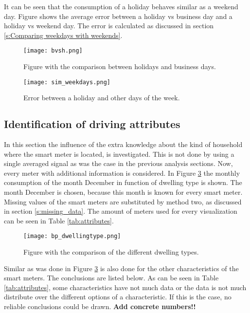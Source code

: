 It can be seen that the consumption of a holiday behaves similar as a weekend day. Figure shows the average error between a holiday vs business day and a holiday vs weekend day. The error is calculated as discussed in section \ref{s:Comparing weekdays with weekends}. 

\begin{figure}[h!]
	\centering
	\texttt{[image: bvsh.png]}
	\caption{Figure with the comparison between holidays and business days.}
	\label{fig:bvsh}
\end{figure}

\begin{figure}[h!]
	\centering
	\texttt{[image: sim\_weekdays.png]}
	\caption{Error between a holiday and other days of the week.}
	\label{fig:sim_weekdays}
\end{figure}


\subsection{Identification of driving attributes} \label{s:Identification of driving attributes}
In this section the influence of the extra knowledge about the kind of household where the smart meter is located, is investigated. This is not done by using a single averaged signal as was the case in the previous analysis sections. Now, every meter with additional information is considered. In Figure \ref{fig:bp_dwellingtype} the monthly consumption of the month December in function of dwelling type is shown. The month December is chosen, because this month is known for every smart meter. Missing values of the smart meters are substituted by method two, as discussed in section \ref{s:missing_data}. The amount of meters used for every visualization can be seen in Table \ref{tab:attributes}.


\begin{figure}[h!]
	\centering
	\texttt{[image: bp\_dwellingtype.png]}
	\caption{Figure with the comparison of the different dwelling types.}
	\label{fig:bp_dwellingtype}
\end{figure}





Similar as was done in Figure \ref{fig:bp_dwellingtype} is also done for the other characteristics of the smart meters. The conclusions are listed below. As can be seen in Table \ref{tab:attributes}, some characteristics have not much data or the data is not much distribute over the different options of a characteristic. If this is the case, no reliable conclusions could be drawn. \textbf{Add concrete numbers!!}

